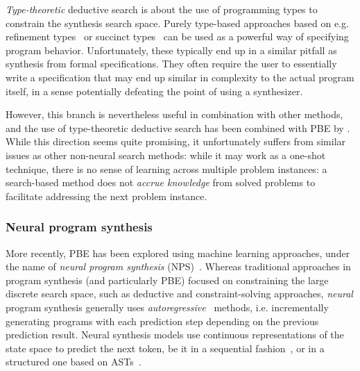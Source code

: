 \documentclass{article}
\begin{document}

\emph{Type-theoretic} deductive search is about the use of programming
types to constrain the synthesis search space.
Purely type-based approaches based on e.g.
refinement types~\citep{synquid} or succinct types~\citep{guospeeding} can be used as a powerful way of specifying program behavior.
Unfortunately, these typically end up in a similar pitfall as
synthesis from formal specifications.
They often require the user to essentially write a specification
that may end up similar in complexity to the actual program itself,
in a sense potentially defeating the point of using a synthesizer.


However, this branch is nevertheless useful in combination with other methods,
and the use of type-theoretic deductive search has been combined with PBE by \citet{myth}.
While this direction seems quite promising,
it unfortunately suffers from similar issues as other non-neural search methods:
while it may work as a one-shot technique,
there is no sense of learning across multiple problem instances:
a search-based method does not \emph{accrue knowledge} from solved problems to facilitate addressing the next problem instance.

\subsubsection{Neural program synthesis}

More recently, PBE has been explored using machine learning approaches, under the name of \emph{neural program synthesis} (NPS)~\citep{nps}.
Whereas traditional approaches in program synthesis (and particularly PBE) focused on constraining the large discrete search space,
such as deductive and constraint-solving approaches,
\emph{neural} program synthesis generally uses \emph{autoregressive}~\citep{kendall1944autoregressive} methods,
i.e. incrementally generating programs with each prediction step depending on the previous prediction result.
Neural synthesis models use continuous representations of the state space to predict the next token,
be it in a sequential fashion~\citep{npi,neuralmachinetranslation,alphanpi},
or in a structured one based on ASTs~\citep{nsps}.
\end{document}
